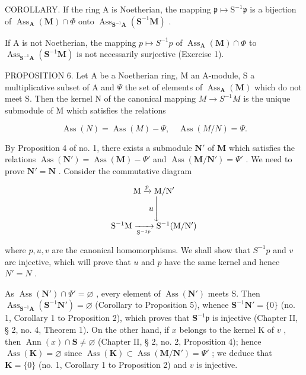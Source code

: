 COROLLARY. If the ring A is Noetherian, the mapping \(\mathfrak{p} \mapsto \mathrm{S}^{-1}\mathfrak{p}\) is a bijection of \(\operatorname{Ass}_{\mathbf{A}}(\mathbf{M}) \cap \Phi\) onto \(\operatorname{Ass}_{\mathbf{S}^{-1}\mathbf{A}}(\mathbf{S}^{-1}\mathbf{M})\) .

If A is not Noetherian, the mapping \(p \mapsto S^{-1}p\) of \(\operatorname{Ass}_{\mathbf{A}}(\mathbf{M}) \cap \Phi\) to \(\operatorname{Ass}_{\mathbf{S}^{-1}\mathbf{A}}(\mathbf{S}^{-1}\mathbf{M})\) is not necessarily surjective (Exercise 1).

PROPOSITION 6. Let A be a Noetherian ring, M an A-module, S a multiplicative subset of A and \(\Psi\) the set of elements of \(\operatorname{Ass}_{\mathbf{A}}(\mathbf{M})\) which do not meet S. Then the kernel N of the canonical mapping \(M \to S^{-1}M\) is the unique submodule of M which satisfies the relations

\[
\operatorname{Ass} (N) = \operatorname{Ass} (M) - \Psi , \quad \operatorname{Ass} (M / N) = \Psi .\tag{3}
\]

By Proposition 4 of no. 1, there exists a submodule \(\mathbf{N}'\) of \(\mathbf{M}\) which satisfies the relations \(\operatorname{Ass}(\mathbf{N}') = \operatorname{Ass}(\mathbf{M}) - \Psi'\) and \(\operatorname{Ass}(\mathbf{M}/\mathbf{N}') = \Psi'\) . We need to prove \(\mathbf{N}' = \mathbf{N}\) . Consider the commutative diagram

\[
\begin{array}{c} \mathrm{M} \xrightarrow {p} \mathrm{M} / \mathrm{N} ^ {\prime} \\ u \Biggl \downarrow \\ \mathrm{S} ^ {- 1} \mathrm{M} \xrightarrow [ \mathrm{S} ^ {- 1 p} ]{} \mathrm{S} ^ {- 1} (\mathrm{M} / \mathrm{N} ^ {\prime}) \end{array}
\]

where \(p, u, v\) are the canonical homomorphisms. We shall show that \(S^{-1}p\) and \(v\) are injective, which will prove that \(u\) and \(p\) have the same kernel and hence \(N' = N\) .

As \(\operatorname{Ass}(\mathbf{N}') \cap \Psi' = \varnothing\) , every element of \(\operatorname{Ass}(\mathbf{N}')\) meets S. Then \(\operatorname{Ass}_{\mathbf{S}^{-1}\mathbf{A}}(\mathbf{S}^{-1}\mathbf{N}') = \varnothing\) (Corollary to Proposition 5), whence \(\mathbf{S}^{-1}\mathbf{N}' = \{0\}\) (no. 1, Corollary 1 to Proposition 2), which proves that \(\mathbf{S}^{-1}\mathfrak{p}\) is injective (Chapter II, § 2, no. 4, Theorem 1). On the other hand, if \(x\) belongs to the kernel K of \(v\) , then \(\operatorname{Ann}(x) \cap \mathbf{S} \neq \varnothing\) (Chapter II, § 2, no. 2, Proposition 4); hence \(\operatorname{Ass}(\mathbf{K}) = \varnothing\) since \(\operatorname{Ass}(\mathbf{K}) \subset \operatorname{Ass}(\mathbf{M}/\mathbf{N}') = \Psi'\) ; we deduce that \(\mathbf{K} = \{0\}\) (no. 1, Corollary 1 to Proposition 2) and \(v\) is injective.

